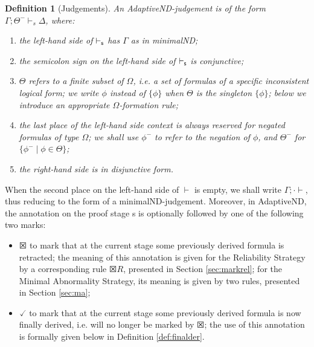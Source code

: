 \documentclass[]{article}
\newtheorem{definition}{Definition}
\begin{document}
\begin{definition}[Judgements]
An {\sf AdaptiveND}-judgement is of the form $\Gamma; \Theta^{-}\vdash_{s} \Delta$, where:

\begin{enumerate}
\item the left-hand side of $\vdash_{\sf s}$ has $\Gamma$ as in {\sf minimalND};
\item the semicolon sign on the left-hand side of $\vdash_{\sf s}$ is conjunctive;
\item $\Theta$ refers to a finite subset of $\Omega$, i.e. a set of formulas of a specific inconsistent logical form; we write $\phi$ instead of $\{\phi\}$ when $\Theta$ is the singleton $\{\phi\}$; below we introduce an appropriate $\Omega$-formation rule;
\item the last place of the left-hand side context is always reserved for negated formulas of type $\Omega$; we shall use $\phi^{-}$ to refer to the negation of $\phi$, and $\Theta^-$ for $\{\phi^- \mid \phi \in \Theta\}$;
\item the right-hand side is in disjunctive form.
\end{enumerate}
\end{definition}
%
When the second place on the left-hand side of $\vdash$ is empty, we shall write $\Gamma;\cdot\vdash$, thus reducing to the form of a {\sf minimalND}-judgement.
Moreover, in {\sf AdaptiveND}, the annotation on the proof stage {\sf s} is optionally followed by one of the following two marks:

\begin{itemize}
    \item[]  $\XBox$ to mark that at the current stage some previously derived formula is retracted; the meaning of this annotation is given for the Reliability Strategy by a corresponding rule $\XBox R$, presented in Section \ref{sec:markrel}; for the Minimal Abnormality Strategy, its meaning is given by two rules, presented in Section \ref{sec:ma};
\item[] $\checked$ to mark that at the current stage some previously derived formula is now finally derived, i.e. will no longer be marked by $\XBox$; the use of this annotation is formally given below in Definition \ref{def:finalder}.
\end{itemize}
\end{document}
